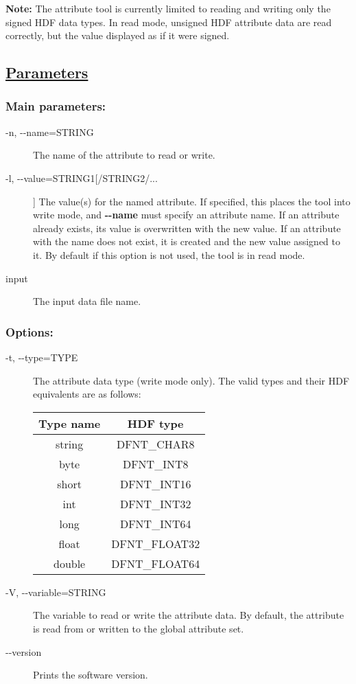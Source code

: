  \textbf{Note:}
 The attribute tool is currently limited to reading and writing only the signed HDF data types. In read mode, unsigned HDF attribute data are read correctly, but the value displayed as if it were signed.
\subsection*{\underline{Parameters}}
\subsubsection*{Main parameters:}
\begin{description}
\item[ -n, -{-}name=STRING ] The name of the attribute to read or write. 
\item[ -l, -{-}value=STRING1[/STRING2/...] ] The value(s) for the named attribute. If specified, this places the tool into write mode, and \textbf{-{-}name}
 must specify an attribute name. If an attribute already exists, its value is overwritten with the new value. If an attribute with the name does not exist, it is created and the new value assigned to it. By default if this option is not used, the tool is in read mode. 
\item[ input ] The input data file name. 

\end{description}
\subsubsection*{Options:}
\begin{description}
\item[ -t, -{-}type=TYPE ] The attribute data type (write mode only). The valid types and their HDF equivalents are as follows: 

\begin{tabular}{|c|c|}
\hline 
Type name &HDF type \\
 \hline 
string &DFNT\_CHAR8 \\
 \hline 
byte &DFNT\_INT8 \\
 \hline 
short &DFNT\_INT16 \\
 \hline 
int &DFNT\_INT32 \\
 \hline 
long &DFNT\_INT64 \\
 \hline 
float &DFNT\_FLOAT32 \\
 \hline 
double &DFNT\_FLOAT64 \\
 \hline 

\end{tabular}


\item[ -V, -{-}variable=STRING ] The variable to read or write the attribute data. By default, the attribute is read from or written to the global attribute set.
\item[-{-}version]Prints the software version.

\end{description}
